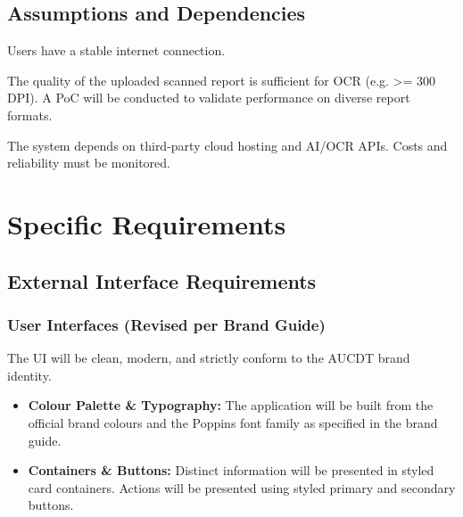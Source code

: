 \documentclass[a4paper, 11pt]{article}
\begin{document}
\subsection{Assumptions and Dependencies}
\begin{description}[\font=\normalfont, style=unboxed]
    \item[\poppinssemibold Assumption:] Users have a stable internet connection.
    \item[\poppinssemibold Assumption:] The quality of the uploaded scanned report is sufficient for OCR (e.g. >= 300 DPI). A PoC will be conducted to validate performance on diverse report formats.
    \item[\poppinssemibold Dependency:] The system depends on third-party cloud hosting and AI/OCR APIs. Costs and reliability must be monitored.
\end{description}

\section{Specific Requirements}

\subsection{External Interface Requirements}
\subsubsection{User Interfaces (Revised per Brand Guide)}
The UI will be clean, modern, and strictly conform to the AUCDT brand identity.
\begin{cardcontainer}[title={UI Component Specifications}]
    \begin{itemize}[label={\color{AUCDTGold}\faPalette}]
        \item \textbf{Colour Palette \& Typography:} The application will be built from the official brand colours and the Poppins font family as specified in the brand guide.
        \item \textbf{Containers \& Buttons:} Distinct information will be presented in styled card containers. Actions will be presented using styled primary and secondary buttons.
    \end{itemize}
\end{cardcontainer}
\end{document}
